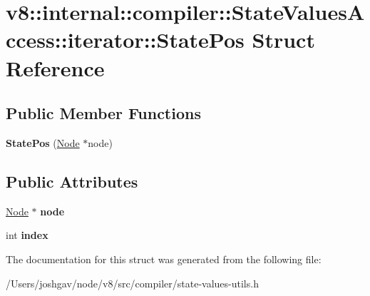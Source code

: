 \hypertarget{structv8_1_1internal_1_1compiler_1_1_state_values_access_1_1iterator_1_1_state_pos}{}\section{v8\+:\+:internal\+:\+:compiler\+:\+:State\+Values\+Access\+:\+:iterator\+:\+:State\+Pos Struct Reference}
\label{structv8_1_1internal_1_1compiler_1_1_state_values_access_1_1iterator_1_1_state_pos}
\subsection*{Public Member Functions}
\begin{DoxyCompactItemize}
\item 
{\bfseries State\+Pos} (\hyperlink{classv8_1_1internal_1_1compiler_1_1_node}{Node} $\ast$node)\hypertarget{structv8_1_1internal_1_1compiler_1_1_state_values_access_1_1iterator_1_1_state_pos_a36f943e8bcb3d72e3d36260e5fdda761}{}\label{structv8_1_1internal_1_1compiler_1_1_state_values_access_1_1iterator_1_1_state_pos_a36f943e8bcb3d72e3d36260e5fdda761}

\end{DoxyCompactItemize}
\subsection*{Public Attributes}
\begin{DoxyCompactItemize}
\item 
\hyperlink{classv8_1_1internal_1_1compiler_1_1_node}{Node} $\ast$ {\bfseries node}\hypertarget{structv8_1_1internal_1_1compiler_1_1_state_values_access_1_1iterator_1_1_state_pos_a48f23e67aef62ddcae2af639b6c2b30f}{}\label{structv8_1_1internal_1_1compiler_1_1_state_values_access_1_1iterator_1_1_state_pos_a48f23e67aef62ddcae2af639b6c2b30f}

\item 
int {\bfseries index}\hypertarget{structv8_1_1internal_1_1compiler_1_1_state_values_access_1_1iterator_1_1_state_pos_a9309dac4b7028a270628c9b3a68d61b2}{}\label{structv8_1_1internal_1_1compiler_1_1_state_values_access_1_1iterator_1_1_state_pos_a9309dac4b7028a270628c9b3a68d61b2}

\end{DoxyCompactItemize}


The documentation for this struct was generated from the following file\+:\begin{DoxyCompactItemize}
\item 
/\+Users/joshgav/node/v8/src/compiler/state-\/values-\/utils.\+h\end{DoxyCompactItemize}
